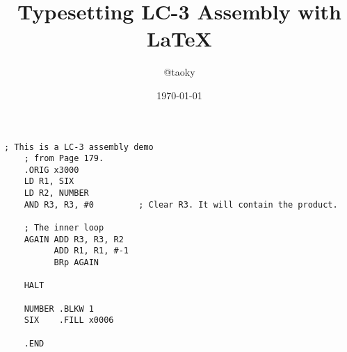 \documentclass{article}
\title{Typesetting LC-3 Assembly with \LaTeX}
\author{@taoky}
\date{\today}
\begin{document}
	\maketitle

	\begin{lstlisting}[caption={Wow, such a wonderful LC-3 program!}]
	; This is a LC-3 assembly demo
	; from Page 179.
	.ORIG x3000
	LD R1, SIX
	LD R2, NUMBER
	AND R3, R3, #0         ; Clear R3. It will contain the product.

	; The inner loop
	AGAIN ADD R3, R3, R2
	      ADD R1, R1, #-1
	      BRp AGAIN

	HALT

	NUMBER .BLKW 1
	SIX    .FILL x0006

	.END
	\end{lstlisting}
\end{document}
